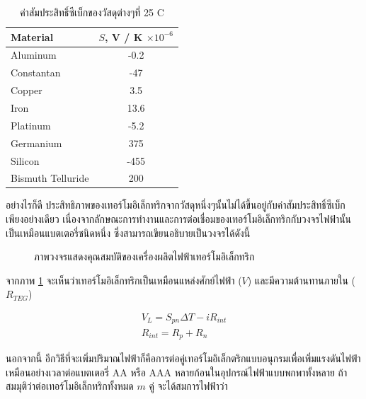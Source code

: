 \message{ !name(solar.tex)}\documentclass[
a4paper,
svgnames,
openany,
justified,
]{tufte-book}
\begin{document}
\begin{table}[h]
  \centering
  \caption{ค่าสัมประสิทธิ์ซีเบ็กของวัสดุต่างๆที่ 25 C}
  \label{tab:seebeck of materials}
  \begin{tabular}{l c}
    \toprule
    Material & $S$, V / K $\times 10^{-6}$ \\
    \midrule
    Aluminum & -0.2 \\
    Constantan & -47 \\
    Copper & 3.5 \\
    Iron & 13.6 \\
    Platinum & -5.2 \\
    Germanium & 375 \\
    Silicon & -455 \\
    Bismuth Telluride & 200 \\
    \bottomrule
  \end{tabular}
\end{table}

อย่างไรก็ดี ประสิทธิภาพของเทอร์โมอิเล็กทริกจากวัสดุหนึ่งๆนั้นไม่ได้ขึ้นอยู่กับค่าสัมประสิทธิ์ซีเบ็กเพียงอย่างเดียว เนื่องจากลักษณะการทำงานและการต่อเชื่อมของเทอร์โมอิเล็กทริกกับวงจรไฟฟ้านั้นเป็นเหมือนแบตเตอรี่ชนิดหนึ่ง ซึ่งสามารถเขียนอธิบายเป็นวงจรได้ดังนี้

\begin{figure}[h]
  \centering
  \caption{ภาพวงจรแสดงคุณสมบัติของเครื่องผลิตไฟฟ้าเทอร์โมอิเล็กทริก}
  \label{fig:thermoelectric circuit}
\end{figure}

จากภาพ \ref{fig:thermoelectric circuit} จะเห็นว่าเทอร์โมอิเล็กทริกเป็นเหมือนแหล่งศักย์ไฟฟ้า ($V$) และมีความต้านทานภายใน ($R_{TEG}$) 

\begin{gather}
  V_L = S_{pn}\Delta T - iR_{int} \\
  R_{int} = R_p + R_n
\end{gather}

นอกจากนี้ อีกวิธีที่จะเพิ่มปริมาณไฟฟ้าก็คือการต่อคู่เทอร์โมอิเล็กตริกแบบอนุกรมเพื่อเพิ่มแรงดันไฟฟ้า เหมือนอย่างเวลาต่อแบตเตอรี่ AA หรือ AAA หลายก้อนในอุปกรณ์ไฟฟ้าแบบพกพาทั้งหลาย ถ้าสมมุติว่าต่อเทอร์โมอิเล็กทริกทั้งหมด $m$ คู่ จะได้สมการไฟฟ้าว่า
\end{document}
